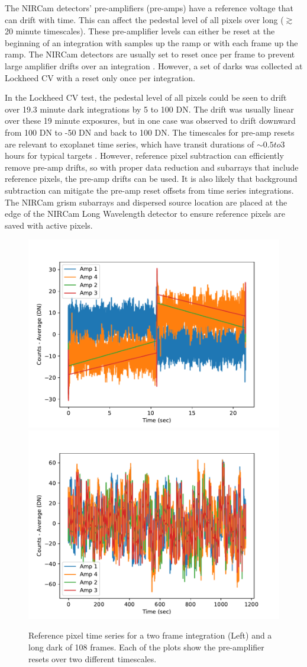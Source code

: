 \documentclass{aastex62}
\begin{document}
The NIRCam detectors' pre-amplifiers (pre-amps) have a reference voltage that can drift with time.
This can affect the pedestal level of all pixels over long ($\gtrsim$ 20 minute timescales).
These pre-amplifier levels can either be reset at the beginning of an integration with samples up the ramp or with each frame up the ramp.
The NIRCam detectors are usually set to reset once per frame to prevent large amplifier drifts over an integration \citep{robberto2014refPixPreAmp}.
However, a set of darks was collected at Lockheed CV with a reset only once per integration.

In the Lockheed CV test, the pedestal level of all pixels could be seen to drift over 19.3 minute dark integrations by 5 to 100 DN.
The drift was usually linear over these 19 minute exposures, but in one case was observed to drift downward from 100 DN to -50 DN and back to 100 DN.
The timescales for pre-amp resets are relevant to exoplanet time series, which have transit durations of $\sim0.5 to 3$ hours for typical targets \citep{robberto2014refPixPreAmp}.
However, reference pixel subtraction can efficiently remove pre-amp drifts, so with proper data reduction and subarrays that include reference pixels, the pre-amp drifts can be used.
It is also likely that background subtraction can mitigate the pre-amp reset offsets from time series integrations.
The NIRCam grism subarrays and dispersed source location are placed at the edge of the NIRCam Long Wavelength detector to ensure reference pixels are saved with active pixels.

\begin{figure}[!hbtp]
\centering
\includegraphics[width=.49\columnwidth]{allamps.pdf}
\includegraphics[width=.49\columnwidth]{allamps_long_dark.pdf}
\caption{Reference pixel time series for a two frame integration (Left) and a long dark of 108 frames. Each of the plots show the pre-amplifier resets over two different timescales.}\label{fig:sampFig}
\end{figure}
\end{document}
